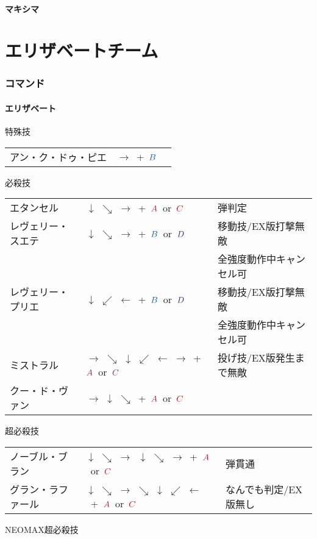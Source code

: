 \documentclass[a4j,11pt]{jarticle}
\def\A{$\textcolor{Acolor}{A}$}
\def\C{$\textcolor{Ccolor}{C}$}
\def\B{$\textcolor{Bcolor}{B}$}
\def\D{$\textcolor{Dcolor}{D}$}
\def\hado{$\downarrow$ $\searrow$ $\rightarrow$}%
\def\tatsu{$\downarrow$ $\swarrow$ $\leftarrow$}%
\def\syoryu{$\rightarrow$ $\downarrow$ $\searrow$}%
\def\tenti{$\rightarrow$ $\searrow$ $\downarrow$ $\swarrow$ $\leftarrow$ $\rightarrow$}%
\def\ryuko{$\downarrow$ $\searrow$ $\rightarrow$ $\searrow$ $\downarrow$ $\swarrow$ $\leftarrow$}%
\def\orochi{$\downarrow$ $\swarrow$ $\leftarrow$ $\swarrow$ $\downarrow$ $\searrow$ $\rightarrow$}%
\begin{document}
\subsection{マキシマ}
\newpage
\part{エリザベートチーム}%
\section{コマンド}
\subsection{エリザベート}
\begin{itembox}[l]{特殊技}
\begin{tabular}{lll}
アン・ク・ドゥ・ピエ&$\rightarrow$\ +\ \B&%
\end{tabular}
\end{itembox}
\begin{itembox}[l]{必殺技}
\begin{tabular}{lll}
エタンセル&\hado\ +\ \A\ or\ \C&弾判定\\%
レヴェリー・スエテ&\hado\ +\ \B\ or\ \D&移動技/EX版打撃無敵\\%
&&全強度動作中キャンセル可\\
レヴェリー・プリエ&\tatsu\ +\ \B\ or\ \D&移動技/EX版打撃無敵\\%
&&全強度動作中キャンセル可\\
ミストラル&\tenti\ +\ \A\ or\ \C&投げ技/EX版発生まで無敵\\%
クー・ド・ヴァン&\syoryu\ +\ \A\ or\ \C&%
\end{tabular}
\end{itembox}
\begin{itembox}[l]{超必殺技}
\begin{tabular}{lll}
ノーブル・ブラン&\hado\ \hado\ +\ \A\ or\ \C&弾貫通\\%
グラン・ラファール&\ryuko\ +\ \A\ or\ \C&なんでも判定/EX版無し%
\end{tabular}
\end{itembox}
\begin{itembox}[l]{NEOMAX超必殺技}
\end{itembox}
\newpage
\end{document}
